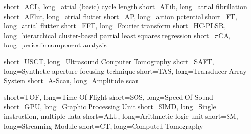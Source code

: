 \usepackage{enumitem}
\newlength\myitemwidth
\setlength\myitemwidth{9em} 						%












  		{short={ACL},		long={atrial (basic) cycle length}}
  		{short={AFib},		long={atrial fibrillation}}
  		{short={AFlut},		long={atrial flutter}}
  		{short={AP},			long={action potential}}
  		{short={FT},			long={atrial flutter}}
  		{short={FFT},		long={Fourier transform}}
  	{short={HC-PLSR},	long={hierarchical cluster-based partial least squares regression}}
  		{short={$\pi$CA},	long={periodic component analysis}}
  
		{short={USCT},	long={Ultrasound Computer Tomography}}
		{short={SAFT},	long={Synthetic aperture focusing technique}}
		{short={TAS},	long={Transducer Array System}}
		{short={A-Scan},	long={Amplitude scan}}

		{short={TOF},	long={Time Of Flight}}
		{short={SOS},	long={Speed Of Sound}}
        {short={GPU},	long={Graphic Processing Unit}}
        {short={SIMD},	long={Single instruction, multiple data}}
        {short={ALU},	long={Arithmetic logic unit}}
        {short={SM},	long={Streaming Module}}
        {short={CT},	long={Computed Tomography}}

